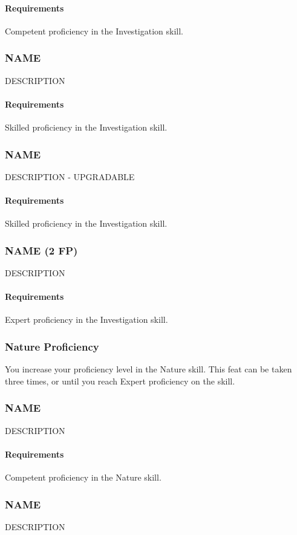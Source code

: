     \paragraph{Requirements} Competent proficiency in the Investigation skill.
\subsubsection{NAME} \label{feat::name}
    DESCRIPTION
    \paragraph{Requirements} Skilled proficiency in the Investigation skill.
\subsubsection{NAME} \label{feat::name}
    DESCRIPTION - UPGRADABLE
    \paragraph{Requirements} Skilled proficiency in the Investigation skill.
\subsubsection{NAME (2 FP)} \label{feat::name}
    DESCRIPTION
    \paragraph{Requirements} Expert proficiency in the Investigation skill.
\subsubsection{Nature Proficiency} \label{feat::natureprof}
    You increase your proficiency level in the Nature skill.
    This feat can be taken three times, or until you reach Expert proficiency on the skill.
\subsubsection{NAME} \label{feat::name}
    DESCRIPTION
    \paragraph{Requirements} Competent proficiency in the Nature skill.
\subsubsection{NAME} \label{feat::name}
    DESCRIPTION
